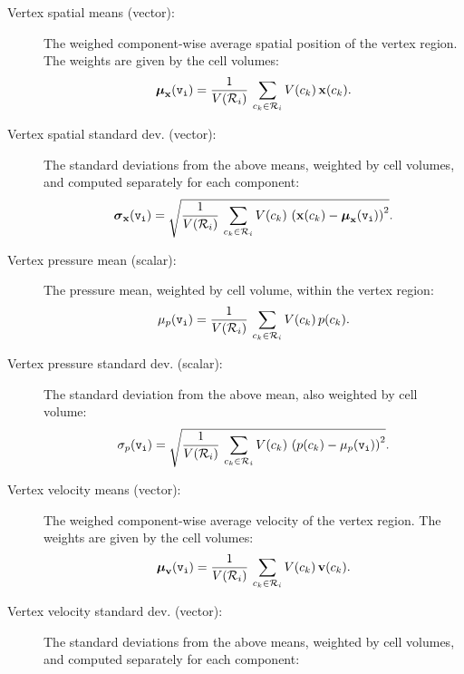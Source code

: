 \begin{description}
%
	\item[Vertex spatial means (vector):] The weighed component-wise average spatial position of the vertex region. The weights are given by the cell volumes:
%
\begin{equation}
	\boldsymbol\mu_\vec{x}(\mathtt{v_i}) =
	\normprod{
		\frac{1}{V(\mathcal{R}_i)}
	}{
		\sum\limits_{c_k\in\mathcal{R}_i} {
			\normprod{ V(c_k) }{ \vec{x}(c_k) }
		}
	}.
\end{equation}
%
%  
  \item[Vertex spatial standard dev. (vector):] The standard deviations from the above means, weighted by cell volumes, and computed separately for each component:
%
\begin{equation}
	\boldsymbol\sigma_\vec{x}(\mathtt{v_i}) = \sqrt{
		\normprod{
			\frac{1}{V(\mathcal{R}_i)}
		}{
			\sum\limits_{c_k\in\mathcal{R}_i}{
			 	\normprod{
			 		V(c_k)
			 	}{
			 		\left( \vec{x}(c_k) - \boldsymbol\mu_\vec{x}(\mathtt{v_i}) \right)^2 
			 	}
			} 
		}
	}.
\end{equation}
%
	\item[Vertex pressure mean (scalar):] The pressure mean, weighted by cell volume, within the vertex region:
%
\begin{equation}
	\mu_p(\mathtt{v_i}) =
		\normprod{ 		
			\frac{1}{V(\mathcal{R}_i)}
		}{
			\sum\limits_{c_k\in\mathcal{R}_i} { \normprod{V(c_k)}{p(c_k)} }
		}.
\end{equation}
%
%
	\item[Vertex pressure standard dev. (scalar):] The standard deviation from the above mean, also weighted by cell volume:
%
\begin{equation}
	\sigma_p(\mathtt{v_i}) = \sqrt{ 
		\normprod{
			\frac{1}{V(\mathcal{R}_i)}
		}{
			\sum\limits_{c_k\in\mathcal{R}_i} {
				\normprod{
					V(c_k)
				}{
					\left( p(c_k) - \mu_p(\mathtt{v_i}) \right)^2
				} 
			}
		} 
	}.
\end{equation}
%
%
	\item[Vertex velocity means (vector):] The weighed component-wi\-se average velocity of the vertex region. The weights are given by the cell volumes:
%
\begin{equation}
	\boldsymbol\mu_\vec{v}(\mathtt{v_i}) =
	\normprod{
		\frac{1}{V(\mathcal{R}_i)}
	}{
		\sum\limits_{c_k\in\mathcal{R}_i} {
			\normprod{ V(c_k) }{ \vec{v}(c_k) }
		}
	}.
\end{equation}
%
%
  \item[Vertex velocity standard dev. (vector):] The standard deviations from the above means, weighted by cell volumes, and computed separately for each component:

\end{description}
